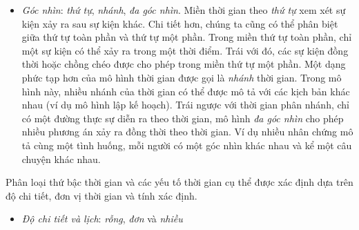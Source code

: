 \begin{itemize}
    \item \textit{Góc nhìn}: \textit{thứ tự}, \textit{nhánh}, \textit{đa góc nhìn}. Miền thời gian theo \textit{thứ tự} xem xét sự kiện xảy ra sau sự kiện khác. Chi tiết hơn, chúng ta cũng có thể phân biệt giữa thứ tự toàn phần và thứ tự một phần. Trong miền thứ tự toàn phần, chỉ một sự kiện có thể xảy ra trong một thời điểm. Trái với đó, các sự kiện đồng thời hoặc chồng chéo được cho phép trong miền thứ tự một phần. Một dạng phức tạp hơn của mô hình thời gian được gọi là \textit{nhánh} thời gian. Trong mô hình này, nhiều nhánh của thời gian có thể được mô tả với các kịch bản khác nhau (ví dụ mô hình lập kế hoạch). Trái ngược với thời gian phân nhánh, chỉ có một đường thực sự diễn ra theo thời gian, mô hình \textit{đa góc nhìn} cho phép nhiều phương án xảy ra đồng thời theo thời gian. Ví dụ nhiều nhân chứng mô tả cùng một tình huống, mỗi người có một góc nhìn khác nhau và kể một câu chuyện khác nhau.
\end{itemize}
Phân loại thứ bậc thời gian và các yếu tố thời gian cụ thể được xác định dựa trên độ chi tiết, đơn vị thời gian và tính xác định.
\begin{itemize}
    \item \textit{Độ chi tiết và lịch}: \textit{rỗng}, \textit{đơn} và \textit{nhiều}
\end{itemize}